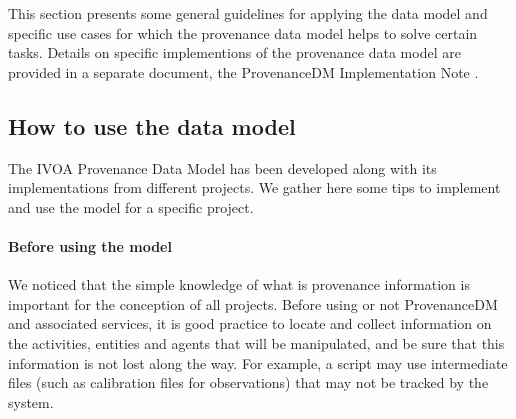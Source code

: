 %

This section presents some general guidelines for applying the data model and
specific use cases for which the provenance data model helps to solve certain tasks. Details on specific implementions of the provenance data model are provided in a separate document, the ProvenanceDM Implementation Note \citep{std:ProvenanceImplementationNote}.


\subsection{How to use the data model}

The IVOA Provenance Data Model has been developed along with its implementations from different projects. 
We gather here some tips to implement and use the model for a specific project.

\paragraph{Before using the model}
We noticed that the simple knowledge of what is provenance information is important for the conception of all projects. Before using or not ProvenanceDM and associated services, it is good practice to locate and collect information on the activities, entities and agents that will be manipulated, and be sure that this information is not lost along the way. For example, a script may use intermediate files (such as calibration files for observations) that may not be tracked by the system.


